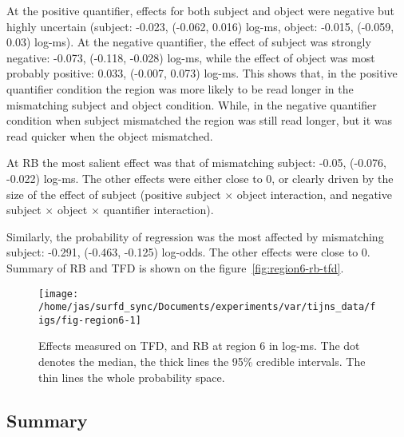 At the positive quantifier, effects for both subject and object were negative but highly uncertain (subject: -0.023, (-0.062, 0.016) log-ms, object: -0.015, (-0.059, 0.03) log-ms). At the negative quantifier, the effect of subject was strongly negative: -0.073, (-0.118, -0.028) log-ms, while the effect of object was most probably positive: 0.033, (-0.007, 0.073) log-ms.
This shows that, in the positive quantifier condition the region was more likely to be read longer in the mismatching subject and object condition. While, in the negative quantifier condition when subject mismatched the region was still read longer, but it was read quicker when the object mismatched.

At RB the most salient effect was that of mismatching subject: -0.05, (-0.076, -0.022) log-ms. The other effects were either close to 0, or clearly driven by the size of the effect of subject (positive subject $\times$ object interaction, and negative subject $\times$ object $\times$ quantifier interaction).

Similarly, the probability of regression was the most affected by mismatching subject: -0.291, (-0.463, -0.125) log-odds. The other effects were close to 0.
Summary of RB and TFD is shown on the figure~\ref{fig:region6-rb-tfd}.

\begin{knitrout}
\color{fgcolor}\begin{figure}
\texttt{[image: /home/jas/surfd\_sync/Documents/experiments/var/tijns\_data/figs/fig-region6-1]} \caption{\label{fig:region6-rb-tfd}Effects measured on TFD, and RB at region 6 in log-ms. The dot denotes the median, the thick lines the 95\% credible intervals. The thin lines the whole probability space.}\label{fig:fig-region6}
\end{figure}

\end{knitrout}

\subsection{Summary}

